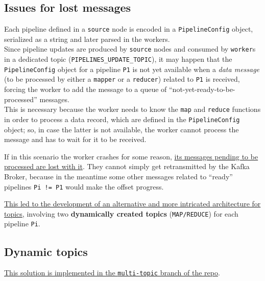 \subsection{Issues for lost messages}
Each pipeline defined in a \texttt{source} node is encoded in a \lstinline|PipelineConfig| object, serialized as a string and later parsed in the workers.\\ 
Since pipeline updates are produced by \texttt{source} nodes and consumed by \texttt{worker}s in a dedicated topic (\lstinline|PIPELINES_UPDATE_TOPIC|), it may happen that the \lstinline|PipelineConfig| object for a pipeline \lstinline|P1| is not yet available when a \textit{data message} (to be processed by either a \texttt{mapper} or a \texttt{reducer}) related to \lstinline|P1| is received, forcing the worker to add the message to a queue of ``not-yet-ready-to-be-processed'' messages.\\
This is necessary because the worker needs to know the \lstinline|map| and \lstinline|reduce| functions in order to process a data record, which are defined in the \lstinline|PipelineConfig| object;
so, in case the latter is not available, the worker cannot process the message and has to wait for it to be received.

If in this scenario the worker crashes for some reason, \ul{its messages pending to be processed are lost with it}.
They cannot simply get retransmitted by the Kafka Broker, because in the meantime some other messages related to ``ready'' pipelines \lstinline|Pi != P1| would make the offset progress.


\ul{This led to the development of an alternative and more intricated architecture for topics}, involving two \textbf{dynamically created topics} (\lstinline|MAP/REDUCE|) for each pipeline \lstinline|Pi|.

\subsection{Dynamic topics}
\ul{This solution is implemented in the \texttt{multi-topic} branch of the repo}.

